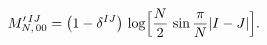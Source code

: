 \begin{equation}
M_{N,\,00}^{\prime\,IJ}=\bigl(1-\delta^{IJ}\bigr)\,
\log\Bigl[\frac{N}{2}\,\sin\frac{\pi}{N}|I-J|\Bigr].
\label{M'IJ00}
\end{equation}

